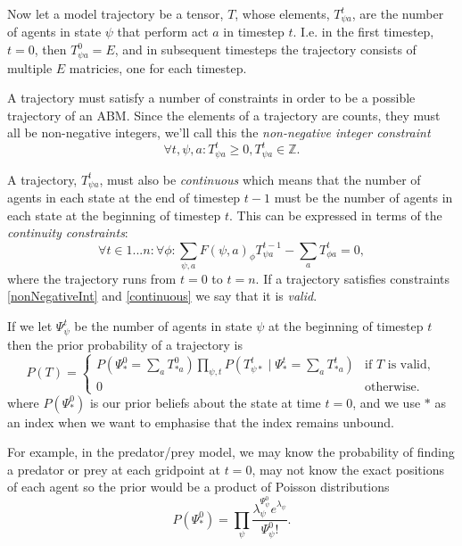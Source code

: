Now let a model trajectory be a tensor, $T$, whose elements, $T^t_{\psi a}$, are the number of agents in state $\psi$ that perform act $a$ in timestep $t$. I.e. in the first timestep, $t=0$, then $T^0_{\psi a} = E$, and in subsequent timesteps the trajectory consists of multiple $E$ matricies, one for each timestep.

A trajectory must satisfy a number of constraints in order to be a possible trajectory of an ABM. Since the elements of a trajectory are counts, they must all be non-negative integers, we'll call this the \textit{non-negative integer constraint}
\begin{equation}
\forall t,\psi, a: T^t_{\psi a} \ge 0, T^t_{\psi a} \in \mathbb{Z}.
\label{nonNegativeInt}
\end{equation}

A trajectory, $T^t_{\psi a}$, must also be \textit{continuous} which means that the number of agents in each state at the end of timestep $t-1$ must be the number of agents in each state at the beginning of timestep $t$. This can be expressed in terms of the \textit{continuity constraints}:
\begin{equation}
\forall t \in 1 ... n:\forall \phi: \sum_{\psi, a} F(\psi, a)_\phi T^{t-1}_{\psi a} - \sum_a T^t_{\phi a} = 0,
\label{continuous}
\end{equation}
where the trajectory runs from $t=0$ to $t=n$. If a trajectory satisfies constraints \ref{nonNegativeInt} and \ref{continuous} we say that it is \textit{valid}.

If we let $\Psi^t_\psi$ be the number of agents in state $\psi$ at the beginning of timestep $t$ then the prior probability of a trajectory is
\[
P(T) =
\begin{cases}
P\left(\Psi^0_{*} = \sum_a T^0_{* a}\right) \prod_{\psi, t} P\left(T^t_{\psi *} \mid \Psi^t_* = \sum_a T^t_{* a}\right) & \text{if } T \text{ is valid}, \\
0 & \text{otherwise}.
\end{cases}
\]
where $P(\Psi^0_*)$ is our prior beliefs about the state at time $t=0$, and we use $*$ as an index when we want to emphasise that the index remains unbound.

For example, in the predator/prey model, we may know the probability of finding a predator or prey at each gridpoint at $t=0$, may not know the exact positions of each agent so the prior would be a product of Poisson distributions
\[
P(\Psi^0_*) = \prod_\psi \frac{\lambda_\psi^{\Psi^0_\psi} e^{\lambda_\psi}}{\Psi^0_\psi!}.
\]

